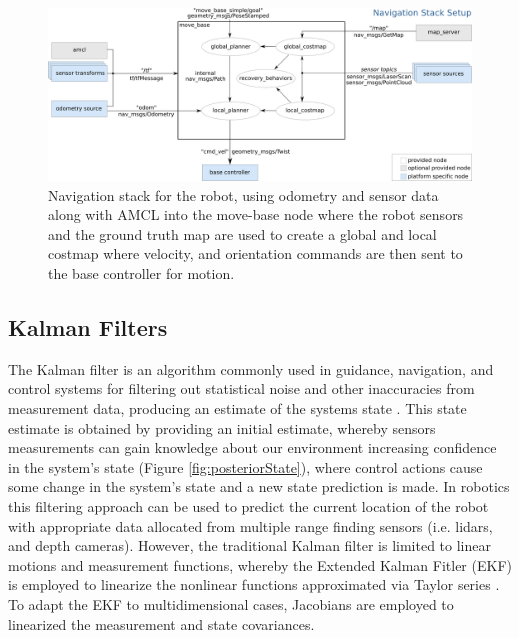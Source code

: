 \documentclass[10pt,journal,compsoc]{IEEEtran}
\begin{document}
\begin{figure}[thpb]
      \centering
      \includegraphics[width=\linewidth]{../img/overview_tf.png}
      \caption{Navigation stack for the robot, using odometry and sensor data along with AMCL into the move-base node where the robot sensors and the ground truth map are used to create a global and local costmap where velocity, and orientation commands are then sent to the base controller for motion.}
      \label{fig:navstack}
\end{figure}

\subsection{Kalman Filters}
The Kalman filter is an algorithm commonly used in guidance, navigation, and control systems for filtering out statistical noise and other inaccuracies from measurement data, producing an estimate of the systems state \cite{kalmanwiki}. This state estimate is obtained by providing an initial estimate, whereby sensors measurements can gain knowledge about our environment increasing confidence in the system's state (Figure \ref{fig:posteriorState}), where control actions cause some change in the system's state and a new state prediction is made. In robotics this filtering approach can be used to predict the current location of the robot with appropriate data allocated from multiple range finding sensors (i.e. lidars, and depth cameras). However, the traditional Kalman filter is limited to linear motions and measurement functions, whereby the Extended Kalman Fitler (EKF) is employed to linearize the nonlinear functions approximated via Taylor series \cite{UdacityLesson10}. To adapt the EKF to multidimensional cases, Jacobians are employed to linearized the measurement and state covariances.
\end{document}
